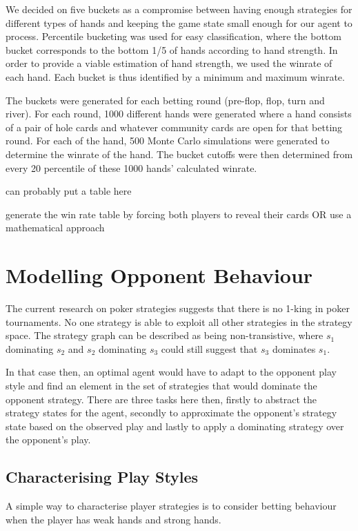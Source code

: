 \documentclass{article}
\begin{document}
We decided on five buckets as a compromise between having enough 
strategies for different types of hands and keeping the game state 
small enough for our agent to process. Percentile bucketing was 
used for easy classification, where the bottom bucket corresponds 
to the bottom 1/5 of hands according to hand strength. In order to 
provide a viable estimation of hand strength, we used the winrate of 
each hand. Each bucket is thus identified by a minimum and maximum 
winrate.

The buckets were generated for each betting round (pre-flop, flop, 
turn and river). For each round, 1000 different hands were generated 
where a hand consists of a pair of hole cards and whatever community 
cards are open for that betting round. For each of the hand, 500 
Monte Carlo simulations were generated to determine the winrate of 
the hand. The bucket cutoffs were then determined from every 20 
percentile of these 1000 hands' calculated winrate.

can probably put a table here

generate the win rate table by forcing both players to reveal their cards
OR use a mathematical approach

\section{Modelling Opponent Behaviour}

The current research on poker strategies suggests that there is no 1-king in poker tournaments. No one strategy is able to exploit all other strategies in the strategy space. The strategy graph can be described as being non-transistive, where $s_1$ dominating $s_2$ and $s_2$ dominating $s_3$ could still suggest that $s_3$ dominates $s_1$.

In that case then, an optimal agent would have to adapt to the opponent play style and find an element in the set of strategies that would dominate the opponent strategy.  There are three tasks here then, firstly to abstract the strategy states for the agent, secondly to approximate the opponent's strategy state based on the observed play and lastly to apply a dominating strategy over the opponent's play.

\subsection{Characterising Play Styles}
A simple way to characterise player strategies is to consider betting behaviour when the player has weak hands and strong hands. 
\end{document}
